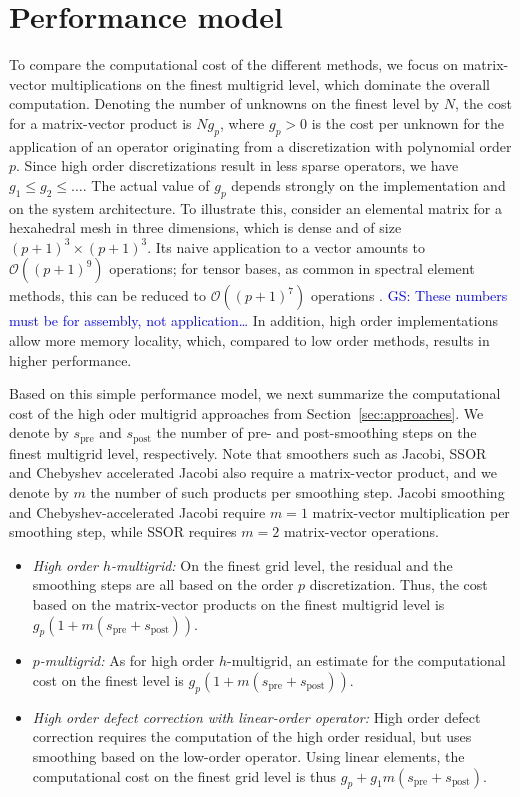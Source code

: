 \documentclass[smallcondensed,final]{svjour3}     %
\newcommand{\gsnote}[1]{\textcolor{blue}{GS: #1}}
\begin{document}
\section{Performance model}
To compare the computational cost of the different methods, we focus
on matrix-vector multiplications on the finest multigrid level, which
dominate the overall computation. Denoting the number of unknowns on
the finest level by $N$, the cost for a matrix-vector product is
$Ng_p$, where $g_p>0$ is the cost per unknown for the application of
an operator originating from a discretization with polynomial order
$p$. Since high order discretizations result in less sparse operators,
we have $g_1\le g_2\le \ldots$. The actual value of $g_p$ depends
strongly on the implementation and on the system architecture. To
illustrate this, consider an elemental matrix for a hexahedral mesh in
three dimensions, which is dense and of size $(p+1)^3\times
(p+1)^3$. Its naive application to a vector amounts to $\mathcal
O((p+1)^9)$ operations; for tensor bases, as common in spectral
element methods, this can be reduced to $\mathcal O((p+1)^7)$
operations \cite{DevilleFischerMund02}. \gsnote{These numbers must be
  for assembly, not application\ldots} In addition, high order
implementations allow more memory locality, which, compared to low
order methods, results in higher performance.

Based on this simple performance model, we next summarize the
computational cost of the high oder multigrid approaches from
Section~\ref{sec:approaches}. We denote by $s_\text{pre}$ and
$s_\text{post}$ the number of pre- and post-smoothing steps on the
finest multigrid level, respectively. Note that smoothers such as
Jacobi, SSOR and Chebyshev accelerated Jacobi also require a
matrix-vector product, and we denote by $m$ the number of such
products per smoothing step.  Jacobi smoothing and
Chebyshev-accelerated Jacobi require $m=1$ matrix-vector
multiplication per smoothing step, while SSOR requires $m=2$
matrix-vector operations.

\begin{itemize}
\item {\em High order $h$-multigrid:} On the finest grid level, the
  residual and the smoothing steps are all based on the order $p$
  discretization. Thus, the cost based on the matrix-vector products
  on the finest multigrid level is
  $g_p(1+m(s_\text{pre}+s_\text{post}))$.

\item {\em $p$-multigrid:} As for high order $h$-multigrid, an
  estimate for the computational cost on the finest level is
  $g_p(1+m(s_\text{pre}+s_\text{post}))$.

\item {\em High order defect correction with linear-order operator:}
  High order defect correction requires the computation of the
  high order residual, but uses smoothing based on the low-order
  operator. Using linear elements, the computational cost on the
  finest grid level is thus
  $g_p+g_1m(s_\text{pre}+s_\text{post})$.
\end{itemize}
\end{document}
